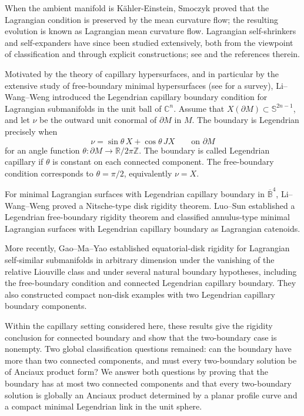 \documentclass[11pt,a4paper]{article}
\numberwithin{equation}{section}
\newcommand{\C}{\mathbb C}
\newcommand{\B}{\mathbb B}
\newcommand{\Sph}{\mathbb S}
\begin{document}
When the ambient manifold is K\"ahler-Einstein, Smoczyk \cite{Smoczyk1996} proved that the Lagrangian condition is preserved by the mean curvature flow; the resulting evolution is known as Lagrangian mean curvature flow. Lagrangian self-shrinkers and self-expanders have since been studied extensively, both from the viewpoint of classification and through explicit constructions; see \cite{Anciaux2006, ArezzoSun2013, CastroLerma2014, ChauChenYuan2012, ChengHiroakiWei2022, Dingxin2014, JoyceLeeTsui2010, LeeWang2009,LeeWang2010,  LiWang2017, 
LotayNeves2013} and the references therein.

Motivated by the theory of capillary hypersurfaces, and in particular by the extensive study of free-boundary minimal hypersurfaces (see \cite{Li2020} for a survey), Li--Wang--Weng \cite{LiWangWeng2021} introduced the Legendrian capillary boundary condition for Lagrangian submanifolds in the unit ball of $\C^n$. Assume that $X(\partial M)\subset\Sph^{2n-1}$, and let $\nu$ be the outward
unit conormal of $\partial M$ in $M$.  
The boundary is Legendrian precisely when
\begin{equation}\label{eq:intro-capillary}
        \nu=\sin\theta\,X+\cos\theta\,JX
        \qquad\text{on }\partial M
\end{equation}
for an angle function $\theta:\partial M\to\mathbb R/2\pi\mathbb Z$.  The
boundary is called Legendrian capillary if $\theta$ is constant on each connected
component.  The free-boundary condition corresponds to $\theta=\pi/2$,
equivalently $\nu=X$. 

For minimal Lagrangian surfaces with Legendrian capillary boundary in $\overline{\B}^4$, Li--Wang--Weng
\cite{LiWangWeng2021} proved a Nitsche-type disk rigidity theorem.  Luo--Sun
\cite{LuoSun2021} established a Legendrian free-boundary rigidity theorem and classified
annulus-type minimal Lagrangian surfaces with Legendrian capillary boundary
as Lagrangian catenoids. 

More recently, Gao--Ma--Yao \cite{GaoMaYao2026} established equatorial-disk rigidity for Lagrangian  self-similar submanifolds in arbitrary dimension under the vanishing of the relative Liouville class and under several natural boundary hypotheses, including the free-boundary condition and connected Legendrian capillary boundary.  They also constructed compact non-disk examples with two Legendrian capillary boundary components.

Within the capillary setting considered here, these results give the
rigidity conclusion for connected boundary and show that the two-boundary
case is nonempty.  Two global classification questions remained: can the
boundary have more than two connected components, and must every
two-boundary solution be of Anciaux product form?  We answer both questions by
proving that the boundary has at most two connected components and that every
two-boundary solution is globally an Anciaux product determined by a planar
profile curve and a compact minimal Legendrian link in the unit sphere.
\end{document}
